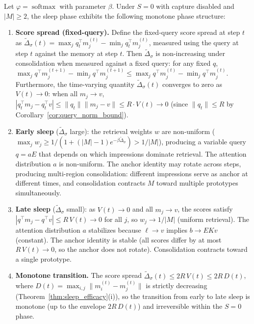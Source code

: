 \begin{theorem}[Phase structure of the $S = 0$ regime; softmax]
\label{thm:sleep_phases}
\leanok
{}
Let $\varphi = \operatorname{softmax}$ with parameter $\beta$.  Under $S = 0$ with capture disabled and $|M| \geq 2$, the sleep phase exhibits the following monotone phase structure:
\begin{enumerate}
\item \textbf{Score spread (fixed-query).}  Define the fixed-query score spread at step $t$ as $\widetilde{\Delta}_\sigma(t) = \max_j q_t^\top m_j^{(t)} - \min_j q_t^\top m_j^{(t)}$, measured using the query at step $t$ against the memory at step $t$.  Then $\widetilde{\Delta}_\sigma$ is non-increasing under consolidation when measured against a fixed query: for any fixed $q$, $\max_j q^\top m_j^{(t+1)} - \min_j q^\top m_j^{(t+1)} \leq \max_j q^\top m_j^{(t)} - \min_j q^\top m_j^{(t)}$.  Furthermore, the time-varying quantity $\widetilde{\Delta}_\sigma(t)$ converges to zero as $V(t) \to 0$: when all $m_j \to v$, $|q_t^\top m_j - q_t^\top v| \leq \|q_t\|\|m_j - v\| \leq R \cdot V(t) \to 0$ (since $\|q_t\| \leq R$ by Corollary~\ref{cor:query_norm_bound}).
\item \textbf{Early sleep} ($\widetilde{\Delta}_\sigma$ large): the retrieval weights $w$ are non-uniform ($\max_j w_j \geq 1/(1 + (|M|-1)e^{-\beta\widetilde{\Delta}_\sigma}) > 1/|M|$), producing a variable query $q = aE$ that depends on which impressions dominate retrieval.  The attention distribution $a$ is non-uniform.  The anchor identity may rotate across steps, producing multi-region consolidation: different impressions serve as anchor at different times, and consolidation contracts $M$ toward multiple prototypes simultaneously.
\item \textbf{Late sleep} ($\widetilde{\Delta}_\sigma$ small): as $V(t) \to 0$ and all $m_j \to v$, the scores satisfy $|q^\top m_j - q^\top v| \leq R\,V(t) \to 0$ for all $j$, so $w_j \to 1/|M|$ (uniform retrieval).  The attention distribution $a$ stabilizes because $\ell \to v$ implies $b \to EKv$ (constant).  The anchor identity is stable (all scores differ by at most $R\,V(t) \to 0$, so the anchor does not rotate).  Consolidation contracts toward a single prototype.
\item \textbf{Monotone transition.}  The score spread $\widetilde{\Delta}_\sigma(t) \leq 2R\,V(t) \leq 2R\,D(t)$, where $D(t) = \max_{i,j}\|m_i^{(t)} - m_j^{(t)}\|$ is strictly decreasing (Theorem~\ref{thm:sleep_efficacy}(i)), so the transition from early to late sleep is monotone (up to the envelope $2R\,D(t)$) and irreversible within the $S = 0$ phase.
\end{enumerate}
\end{theorem}

